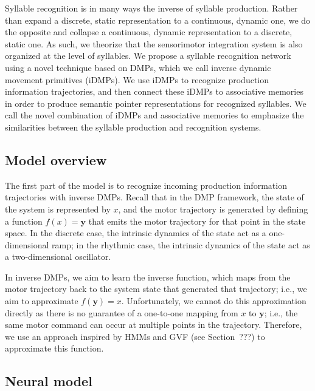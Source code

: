 Syllable recognition is in many ways
the inverse of syllable production.
Rather than expand a discrete, static representation
to a continuous, dynamic one,
we do the opposite and collapse
a continuous, dynamic representation
to a discrete, static one.
As such, we theorize that the sensorimotor integration system
is also organized at the level of syllables.
We propose a syllable recognition network
using a novel technique based on DMPs,
which we call
inverse dynamic movement primitives
(iDMPs).
We use iDMPs to recognize production information trajectories,
and then connect these iDMPs
to associative memories
in order to produce semantic pointer representations
for recognized syllables.
We call the novel combination of
iDMPs and associative memories
to emphasize the similarities
between the syllable production
and recognition systems.

\subsection{Model overview}

The first part of the model is to
recognize incoming production information trajectories
with inverse DMPs.
Recall that in the DMP framework,
the state of the system
is represented by $x$,
and the motor trajectory
is generated by defining
a function $f(x) = \mathbf{y}$ that
emits the motor trajectory
for that point in the state space.
In the discrete case,
the intrinsic dynamics
of the state act
as a one-dimensional ramp;
in the rhythmic case,
the intrinsic dynamics
of the state act
as a two-dimensional oscillator.

In inverse DMPs, we aim to learn the inverse function,
which maps from the motor trajectory
back to the system state that generated that
trajectory; i.e., we aim to approximate
$f(\mathbf{y}) = x$.
Unfortunately, we cannot do this approximation directly
as there is no guarantee of a one-to-one mapping
from $x$ to $\mathbf{y}$;
i.e., the same motor command can occur
at multiple points in the trajectory.
Therefore, we use an approach
inspired by HMMs and GVF
(see Section~???)
to approximate this function.



\subsection{Neural model}
